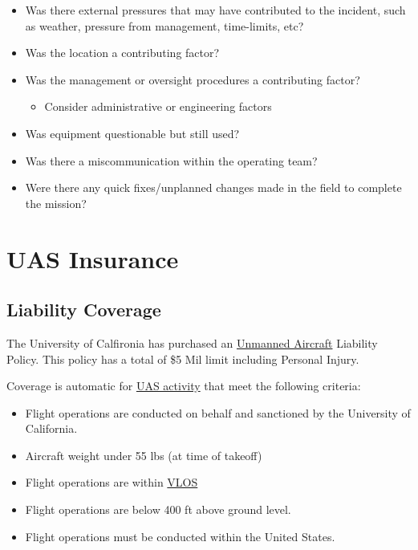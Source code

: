 \documentclass[
]{book}
\providecommand{\tightlist}{%
  \setlength{\itemsep}{0pt}\setlength{\parskip}{0pt}}
\begin{document}
\begin{itemize}
\item
  Was there external pressures that may have contributed to the incident, such as weather, pressure from management, time-limits, etc?
\item
  Was the location a contributing factor?
\item
  Was the management or oversight procedures a contributing factor?

  \begin{itemize}
  \tightlist
  \item
    Consider administrative or engineering factors
  \end{itemize}
\item
  Was equipment questionable but still used?
\item
  Was there a miscommunication within the operating team?
\item
  Were there any quick fixes/unplanned changes made in the field to complete the mission?
\end{itemize}

\hypertarget{ch-insurance}{%
\chapter{UAS Insurance}\label{ch-insurance}}

\hypertarget{s-UC-liability}{%
\section{Liability Coverage}\label{s-UC-liability}}

The University of Calfironia has purchased an \protect\hyperlink{UA}{Unmanned Aircraft} Liability Policy. This policy has a total of \$5 Mil limit including Personal Injury.

Coverage is automatic for \protect\hyperlink{UASactivity}{UAS activity} that meet the following criteria:

\begin{itemize}
\tightlist
\item
  Flight operations are conducted on behalf and sanctioned by the University of California.
\item
  Aircraft weight under 55 lbs (at time of takeoff)
\item
  Flight operations are within \protect\hyperlink{VLOS}{VLOS}
\item
  Flight operations are below 400 ft above ground level.
\item
  Flight operations must be conducted within the United States.
\end{itemize}
\end{document}
